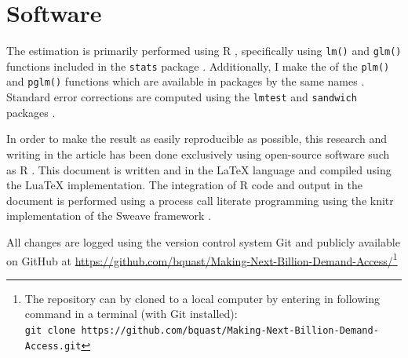 \documentclass[a4paper,british]{article}\usepackage[]{graphicx}\usepackage[]{xcolor}
\makeatletter
\providecommand{\LyX}{\texorpdfstring{\ensureascii{%
  L\kern-.1667em\lower.25em\hbox{Y}\kern-.125emX\@}}{LyX}}
\providecommand*{\code}[1]{\texttt{#1}}
\makeatother
\begin{document}
\newpage{}

\section{Software}

The estimation is primarily performed using R \citep*{R}, specifically
using \code{lm()} and \code{glm()} functions included in the \code{stats}
package \citep{venables2013Splus}. Additionally, I make the of the
\code{plm()} and \code{pglm()} functions which are available in
packages by the same names \citep{croissant2008plm,croissant2013pglm}.
Standard error corrections are computed using the \code{lmtest} and
\code{sandwich} packages \citet{zeileis2002lmtest,zeileis2004sandwichI,zeileis2006sandwichII}.

In order to make the result as easily reproducible as possible, this
research and writing in the article has been done exclusively using
open-source software such as R \citep*{R}. This document is written
and \LyX{} \citep{lyx} in the \LaTeX\citep{lamport1985latex} language
and compiled using the LuaTeX implementation\citep{luatex}. The integration
of R code and output in the document is performed using a process
call literate programming \citet{knuth1984literate} using the knitr
implementation \citet{xie2015knitr} of the Sweave framework \citep{leisch2002sweave}.

All changes are logged using the version control system Git \citep{git}
and publicly available on GitHub at \href{https://github.com/bquast/Making-Next-Billion-Demand-Access/}{https://github.com/bquast/Making-Next-Billion-Demand-Access/}\footnote{The repository can by cloned to a local computer by entering in following
command in a terminal (with Git installed):\\
\code{git clone https://github.com/bquast/Making-Next-Billion-Demand-Access.git}}
\end{document}
